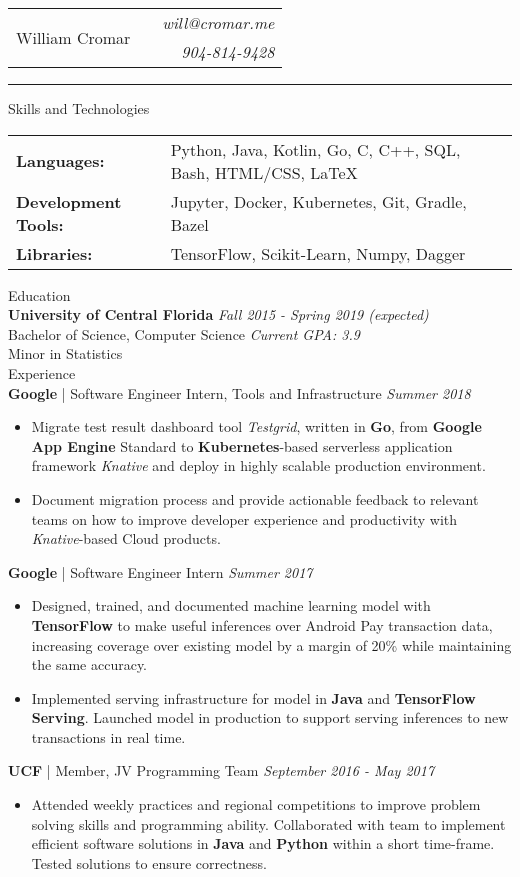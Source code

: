 \documentclass[letterpaper,11pt,oneside]{article}
\newcommand{\mkheader}[3]{
  {\fontfamily{pag}\selectfont
  \begin{tabularx}{\textwidth}{lXr}
    \multirow{2}{*}{\Huge #1} && \emph{#2}
    \\ && \emph{#3}
  \end{tabularx}
  }
  \vspace{2pt}
  \hrule
}
\newcommand{\resheader}[2][]{
  \vspace{9pt}
  {\LARGE #2} #1
  \\
}
\newcommand{\ressubheader}[3][]{
  \vspace{6pt}
  {\large \textbf{#2} #1} \hfill \emph{#3}
  \\
}
\newcommand{\resskill}[1]{\textbf{#1}}
\begin{document}
\mkheader{William Cromar}{will@cromar.me}{904-814-9428}

\resheader{Skills and Technologies}
\vspace{6pt}
\begin{tabular}{>{\bfseries}l@{\hskip .25cm} l}
  Languages: & Python, Java, Kotlin, Go, C, C++, SQL, Bash, HTML/CSS, LaTeX \\
  Development Tools: & Jupyter, Docker, Kubernetes, Git, Gradle, Bazel \\
  Libraries: & TensorFlow, Scikit-Learn, Numpy, Dagger
\end{tabular}


\resheader{Education}
\ressubheader{University of Central Florida}{Fall 2015 - Spring 2019 (expected)}
Bachelor of Science, Computer Science \hfill \emph{Current GPA: 3.9} \\
Minor in Statistics \\

\resheader{Experience}
\ressubheader[| Software Engineer Intern, Tools and Infrastructure]{Google}{Summer 2018}
\begin{itemize}
  \item Migrate test result dashboard tool \emph{Testgrid}, written in \resskill{Go}, from \resskill{Google App Engine} Standard to \resskill{Kubernetes}-based serverless application framework \emph{Knative} and deploy in highly scalable production environment.
  \item Document migration process and provide actionable feedback to relevant teams on how to improve developer experience and productivity with \emph{Knative}-based Cloud products.
\end{itemize}

\ressubheader[| Software Engineer Intern]{Google}{Summer 2017}
\begin{itemize}
  \item Designed, trained, and documented machine learning model with \resskill{TensorFlow} to make useful inferences over Android Pay transaction data, increasing coverage over existing model by a margin of 20\% while maintaining the same accuracy.
  \item Implemented serving infrastructure for model in \resskill{Java} and \resskill{TensorFlow Serving}. Launched model in production to support serving inferences to new transactions in real time.
\end{itemize}

\ressubheader[| Member, JV Programming Team]{UCF}{September 2016 - May 2017}
\begin{itemize}
  \item Attended weekly practices and regional competitions to improve problem solving skills and programming ability. Collaborated with team to implement efficient software solutions in \resskill{Java} and \resskill{Python} within a short time-frame. Tested solutions to ensure correctness.
\end{itemize}
\end{document}
